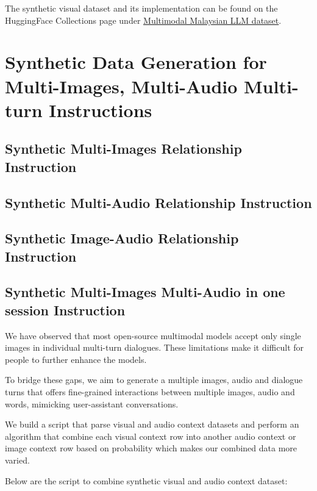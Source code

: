 \documentclass[preprint]{article}
\begin{document}
The synthetic visual dataset and its implementation can be found on the HuggingFace Collections page under \href{https://huggingface.co/collections/mesolitica/multimodal-malaysian-llm-dataset-653a16214037a1bc4417eb3a}{Multimodal Malaysian LLM dataset}.

\section{Synthetic Data Generation for Multi-Images, Multi-Audio Multi-turn Instructions}

\subsection{Synthetic Multi-Images Relationship Instruction}

\subsection{Synthetic Multi-Audio Relationship Instruction}

\subsection{Synthetic Image-Audio Relationship Instruction}

\subsection{Synthetic Multi-Images Multi-Audio in one session Instruction}

We have observed that most open-source multimodal models accept only single images in individual multi-turn dialogues. These limitations make it difficult for people to further enhance the models.

To bridge these gaps, we aim to generate a multiple images, audio and dialogue turns that offers fine-grained interactions between multiple images, audio and words, mimicking user-assistant conversations.

We build a script that parse visual and audio context datasets and perform an algorithm that combine each visual context row into another audio context or image context row based on probability which makes our combined data more varied.

Below are the script to combine synthetic visual and audio context dataset:
\end{document}
